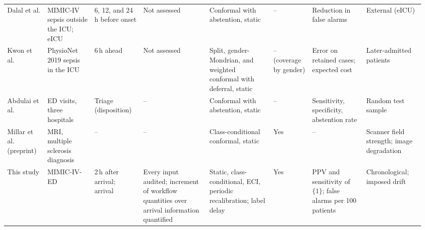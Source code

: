 \begin{table}[H]
\begin{tabular}{@{}L{2.1cm}L{2.5cm}L{2.0cm}L{2.6cm}L{2.6cm}L{1.4cm}L{2.3cm}L{2.1cm}@{}}
Dalal et al.  & MIMIC-IV sepsis outside the ICU; eICU & 6, 12, and 24\,h before onset & Not assessed & Conformal with abstention, static & -- & Reduction in false alarms & External (eICU) \\
Kwon et al.  & PhysioNet 2019 sepsis in the ICU & 6\,h ahead & Not assessed & Split, gender-Mondrian, and weighted conformal with deferral, static & -- (coverage by gender) & Error on retained cases; expected cost & Later-admitted patients \\
Abdulai et al.  & ED visits, three hospitals & Triage (disposition) & -- & Conformal with abstention, static & -- & Sensitivity, specificity, abstention rate & Random test sample \\
Millar et al.  (preprint) & MRI, multiple sclerosis diagnosis & -- & -- & Class-conditional conformal, static & Yes & -- & Scanner field strength; image degradation \\
\midrule
This study & MIMIC-IV-ED & 2\,h after arrival; arrival & Every input audited; increment of workflow quantities over arrival information quantified & Static, class-conditional, ECI, periodic recalibration; label delay & Yes & PPV and sensitivity of $\{1\}$; false alarms per 100 patients & Chronological; imposed drift \\
\bottomrule
\end{tabular}
\end{table}
